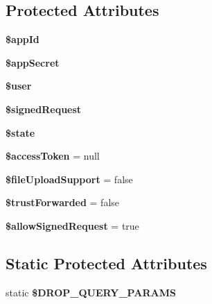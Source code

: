 \subsection*{Protected Attributes}
\begin{DoxyCompactItemize}
\item 
\hypertarget{class_base_facebook_a37486f0bbe35e62c5ba1e129441b6ac6}{{\bfseries \$app\-Id}}\label{class_base_facebook_a37486f0bbe35e62c5ba1e129441b6ac6}

\item 
\hypertarget{class_base_facebook_a19ad14f3521ed6335766241900e5b95b}{{\bfseries \$app\-Secret}}\label{class_base_facebook_a19ad14f3521ed6335766241900e5b95b}

\item 
\hypertarget{class_base_facebook_a598ca4e71b15a1313ec95f0df1027ca5}{{\bfseries \$user}}\label{class_base_facebook_a598ca4e71b15a1313ec95f0df1027ca5}

\item 
\hypertarget{class_base_facebook_a431a801575d1145d1a9621e7fd176ed9}{{\bfseries \$signed\-Request}}\label{class_base_facebook_a431a801575d1145d1a9621e7fd176ed9}

\item 
\hypertarget{class_base_facebook_ae82306c4f2d17d8dd5c7d8d916b33bed}{{\bfseries \$state}}\label{class_base_facebook_ae82306c4f2d17d8dd5c7d8d916b33bed}

\item 
\hypertarget{class_base_facebook_a14696362b35353b3280dfbec3f88861d}{{\bfseries \$access\-Token} = null}\label{class_base_facebook_a14696362b35353b3280dfbec3f88861d}

\item 
\hypertarget{class_base_facebook_a06aa2734d6a181d46ea99b3122015d83}{{\bfseries \$file\-Upload\-Support} = false}\label{class_base_facebook_a06aa2734d6a181d46ea99b3122015d83}

\item 
\hypertarget{class_base_facebook_a9e9553ab0d6eae971c3e232a817fb845}{{\bfseries \$trust\-Forwarded} = false}\label{class_base_facebook_a9e9553ab0d6eae971c3e232a817fb845}

\item 
\hypertarget{class_base_facebook_ad8523109d648176ce6551eac3795d506}{{\bfseries \$allow\-Signed\-Request} = true}\label{class_base_facebook_ad8523109d648176ce6551eac3795d506}

\end{DoxyCompactItemize}
\subsection*{Static Protected Attributes}
\begin{DoxyCompactItemize}
\item 
static {\bfseries \$\-D\-R\-O\-P\-\_\-\-Q\-U\-E\-R\-Y\-\_\-\-P\-A\-R\-A\-M\-S}
\end{DoxyCompactItemize}


